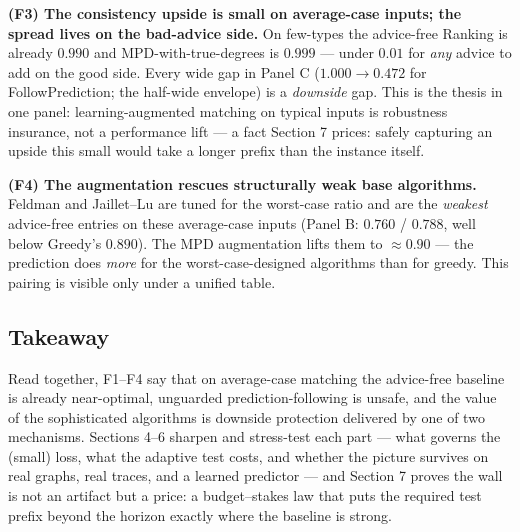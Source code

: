 \textbf{(F3) The consistency upside is small on average-case inputs; the
spread lives on the bad-advice side.} On few-types the advice-free
Ranking is already \(0.990\) and MPD-with-true-degrees is \(0.999\) ---
under \(0.01\) for \emph{any} advice to add on the good side. Every wide
gap in Panel C (\(1.000\!\to\!0.472\) for FollowPrediction; the
half-wide envelope) is a \emph{downside} gap. This is the thesis in one
panel: learning-augmented matching on typical inputs is robustness
insurance, not a performance lift --- a fact Section 7 prices: safely
capturing an upside this small would take a longer prefix than the
instance itself.

\textbf{(F4) The augmentation rescues structurally weak base
algorithms.} Feldman and Jaillet--Lu are tuned for the worst-case ratio
and are the \emph{weakest} advice-free entries on these average-case
inputs (Panel B: \(0.760\) / \(0.788\), well below Greedy's \(0.890\)).
The MPD augmentation lifts them to \(\approx 0.90\) --- the prediction
does \emph{more} for the worst-case-designed algorithms than for greedy.
This pairing is visible only under a unified table.

\subsection{Takeaway}

Read together, F1--F4 say that on average-case matching the advice-free
baseline is already near-optimal, unguarded prediction-following is
unsafe, and the value of the sophisticated algorithms is downside
protection delivered by one of two mechanisms. Sections 4--6 sharpen and
stress-test each part --- what governs the (small) loss, what the
adaptive test costs, and whether the picture survives on real graphs,
real traces, and a learned predictor --- and Section 7 proves the wall
is not an artifact but a price: a budget--stakes law that puts the
required test prefix beyond the horizon exactly where the baseline is
strong.
